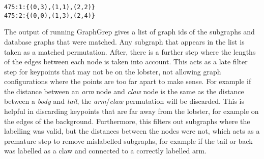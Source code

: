 \begin{lstlisting}[caption={Example of matching output from GraphGrep}]
475:1:{(0,3),(1,1),(2,2)}
475:2:{(0,0),(1,3),(2,4)}
\end{lstlisting}

The output of running GraphGrep gives a list of graph ids of the subgraphs and database graphs that were matched. Any subgraph that appears in the list is taken as a matched permutation. After, there is a further step where the lengths of the edges between each node is taken into account. This acts as a late filter step for keypoints that may not be on the lobster, not allowing graph configurations where the points are too far apart to make sense. For example if the distance between an \textit{arm} node and \textit{claw} node is the same as the distance between a \textit{body} and \textit{tail}, the \textit{arm}/\textit{claw} permutation will be discarded. This is helpful in discarding keypoints that are far away from the lobster, for example on the edges of the background. Furthermore, this filters out subgraphs where the labelling was valid, but the distances between the nodes were not, which acts as a premature step to remove mislabelled subgraphs, for example if the tail or back was labelled as a claw and connected to a correctly labelled arm. 

